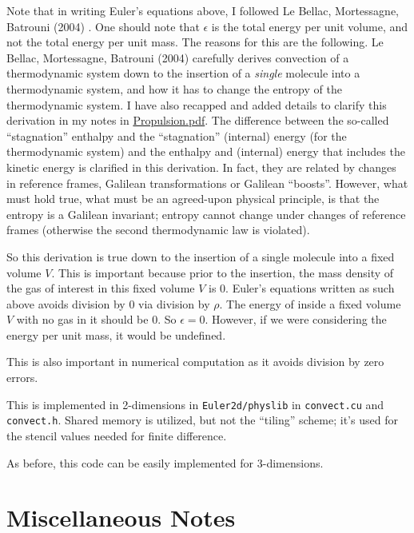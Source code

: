 \documentclass[10pt]{amsart}
\begin{document}
Note that in writing Euler's equations above, I followed Le Bellac, Mortessagne, Batrouni (2004) \cite{MLeBellacFMortessagneGBatrouni2004}.  One should note that $\epsilon$ is the total energy per unit volume, and not the total energy per unit mass.  The reasons for this are the following.  Le Bellac, Mortessagne, Batrouni (2004) \cite{MLeBellacFMortessagneGBatrouni2004} carefully derives convection of a thermodynamic system down to the insertion of a \emph{single} molecule into a thermodynamic system, and how it has to change the entropy of the thermodynamic system.  I have also recapped and added details to clarify this derivation in my notes in \href{https://github.com/ernestyalumni/Propulsion/blob/master/LaTeXandpdfs/Propulsion.pdf}{Propulsion.pdf}.  The difference between the so-called ``stagnation'' enthalpy and the ``stagnation'' (internal) energy (for the thermodynamic system) and the enthalpy and (internal) energy that includes the kinetic energy is clarified in this derivation.  In fact, they are related by changes in reference frames, Galilean transformations or Galilean ``boosts''.  However, what must hold true, what must be an agreed-upon physical principle, is that the entropy is a Galilean invariant; entropy cannot change under changes of reference frames (otherwise the second thermodynamic law is violated).

So this derivation is true down to the insertion of a single molecule into a fixed volume $V$.  This is important because prior to the insertion, the mass density of the gas of interest in this fixed volume $V$ is $0$.  Euler's equations written as such above avoids division by $0$ via division by $\rho$.  The energy of inside a fixed volume $V$ with no gas in it should be $0$.  So $\epsilon =0$.  However, if we were considering the energy per unit mass, it would be undefined.

This is also important in numerical computation as it avoids division by zero errors.

This is implemented in 2-dimensions in \verb|Euler2d/physlib| in \verb|convect.cu| and \verb|convect.h|.  Shared memory is utilized, but not the ``tiling'' scheme; it's used for the stencil values needed for finite difference.

As before, this code can be easily implemented for 3-dimensions.  

\section{Miscellaneous Notes}
\end{document}
